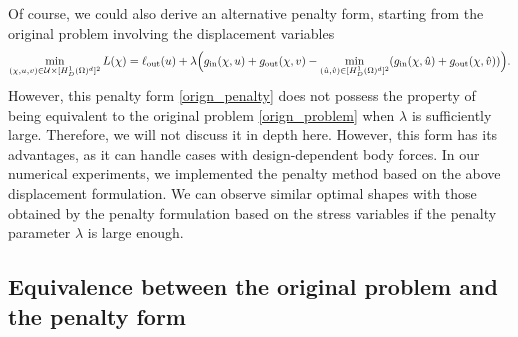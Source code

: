 \documentclass{amsart}
\begin{document}
Of course, we could also derive an alternative penalty form, starting from the original problem involving the displacement variables
\begin{equation}\label{orign_penalty}
    \min_{(\chi,u,v)\in\mathcal{U}\times [H_D^1(\Omega)^d]^2}L(\chi)=\ell_{\rm out}(u)+\lambda\Big (g_{\rm in}(\chi,u)+g_{\rm out}(\chi,v)-\min_{(\hat u,\hat v)\in[H_D^1(\Omega)^d]^2}(g_{\rm in}(\chi,\hat{u})+g_{\rm out}(\chi,\hat{v}))\Big).
\end{equation}
However, this penalty form \eqref{orign_penalty} does not possess the property of being equivalent to the original problem \eqref{orign_problem} when \(\lambda\) is sufficiently large. Therefore, we will not discuss it in depth here. However, this form has its advantages, as it can handle cases with design-dependent body forces. In our numerical experiments, we implemented the penalty method based on the above displacement formulation. We can observe similar optimal shapes with those obtained by  the  penalty formulation based on the stress variables if the penalty parameter $\lambda$ is large enough. %

\subsection{Equivalence between the original problem and the penalty form}
\end{document}
